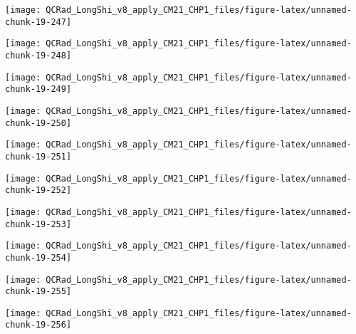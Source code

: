 \documentclass[
  10pt,
  a4paper,oneside]{article}
\begin{document}
\begin{center}\texttt{[image: QCRad\_LongShi\_v8\_apply\_CM21\_CHP1\_files/figure-latex/unnamed-chunk-19-247]} \end{center}

\begin{center}\texttt{[image: QCRad\_LongShi\_v8\_apply\_CM21\_CHP1\_files/figure-latex/unnamed-chunk-19-248]} \end{center}

\begin{center}\texttt{[image: QCRad\_LongShi\_v8\_apply\_CM21\_CHP1\_files/figure-latex/unnamed-chunk-19-249]} \end{center}

\begin{center}\texttt{[image: QCRad\_LongShi\_v8\_apply\_CM21\_CHP1\_files/figure-latex/unnamed-chunk-19-250]} \end{center}

\begin{center}\texttt{[image: QCRad\_LongShi\_v8\_apply\_CM21\_CHP1\_files/figure-latex/unnamed-chunk-19-251]} \end{center}

\begin{center}\texttt{[image: QCRad\_LongShi\_v8\_apply\_CM21\_CHP1\_files/figure-latex/unnamed-chunk-19-252]} \end{center}

\begin{center}\texttt{[image: QCRad\_LongShi\_v8\_apply\_CM21\_CHP1\_files/figure-latex/unnamed-chunk-19-253]} \end{center}

\begin{center}\texttt{[image: QCRad\_LongShi\_v8\_apply\_CM21\_CHP1\_files/figure-latex/unnamed-chunk-19-254]} \end{center}

\begin{center}\texttt{[image: QCRad\_LongShi\_v8\_apply\_CM21\_CHP1\_files/figure-latex/unnamed-chunk-19-255]} \end{center}

\begin{center}\texttt{[image: QCRad\_LongShi\_v8\_apply\_CM21\_CHP1\_files/figure-latex/unnamed-chunk-19-256]} \end{center}
\end{document}
